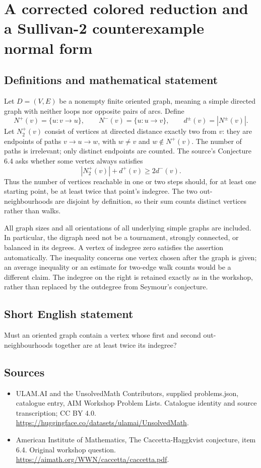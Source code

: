 \documentclass[11pt,a4paper]{article}
\begin{document}
\section*{A corrected colored reduction and a Sullivan-2 counterexample normal form}\label{statement}

\subsection{Definitions and mathematical statement}
Let $D=(V,E)$ be a nonempty finite oriented graph, meaning a simple
directed graph with neither loops nor opposite pairs of arcs. Define
\[
 N^+(v)=\{u:v\to u\},\qquad N^-(v)=\{u:u\to v\},
 \qquad d^\pm(v)=|N^\pm(v)|.
\]
Let $N_2^+(v)$ consist of vertices at directed distance exactly two
from $v$: they are endpoints of paths $v\to u\to w$, with $w\ne v$
and $w\notin N^+(v)$. The number of paths is irrelevant; only distinct
endpoints are counted.
The source's Conjecture 6.4 asks whether some vertex always satisfies
\[
                        |N_2^+(v)|+d^+(v)\ge2d^-(v).
\]
Thus the number of vertices reachable in one or two steps should,
for at least one starting point, be at least twice that point's
indegree. The two out-neighbourhoods are disjoint by definition,
so their sum counts distinct vertices rather than walks.

All graph sizes and all orientations of all underlying simple graphs
are included. In particular, the digraph need not be a tournament,
strongly connected, or balanced in its degrees. A vertex of indegree
zero satisfies the assertion automatically. The inequality concerns
one vertex chosen after the graph is given; an average inequality or
an estimate for two-edge walk counts would be a different claim.
The indegree on the right is retained exactly as in the workshop,
rather than replaced by the outdegree from Seymour's conjecture.
\subsection{Short English statement}
Must an oriented graph contain a vertex whose first and second out-neighbourhoods together are at least twice its indegree?
\subsection{Sources}
\begin{itemize}
\item[S1] ULAM.AI and the UnsolvedMath Contributors, supplied problems.json, catalogue entry, AIM Workshop Problem Lists. Catalogue identity and source transcription; CC BY 4.0.
\url{https://huggingface.co/datasets/ulamai/UnsolvedMath}.
\item[S2] American Institute of Mathematics, The Caccetta-Haggkvist conjecture, item 6.4. Original workshop question.
\url{https://aimath.org/WWN/caccetta/caccetta.pdf}.
\end{itemize}
\end{document}
